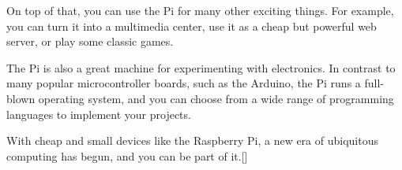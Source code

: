 On top of that, you can use the Pi for many other
exciting things. For example, you can turn it into a multimedia center, use it as a cheap but powerful web server, or play some classic games.
\newline

The Pi is also a great machine for experimenting with electronics. In contrast
to many popular microcontroller boards, such as the Arduino, the Pi runs a
full-blown operating system, and you can choose from a wide range of programming
languages to implement your projects.
\newline

With cheap and small devices like the Raspberry Pi, a new era of ubiquitous
computing has begun, and you can be part of it.[\cite{21}]